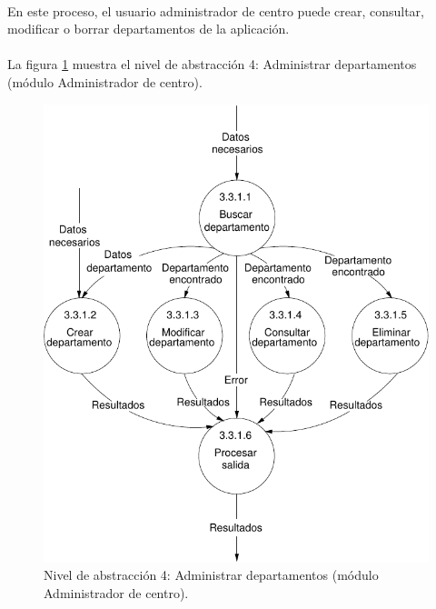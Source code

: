 \paragraph{}En este proceso, el usuario administrador de centro puede crear,
consultar, modificar o borrar departamentos de la aplicación.

\paragraph{}La figura \ref{diagramaNivel4-AdministrarDepartamentos-admCentro}
muestra el nivel de abstracción 4: Administrar departamentos (módulo
Administrador de centro).

  \begin{figure}[!ht]
    \begin{center}
      \includegraphics[]{08.Analisis_Funcional/8.2.DFDs/Niveles/Nivel4/AdministradorCentro/AdministrarDepartamentos/Diagramas/nivel4-AdministrarDepartamentos.pdf}
      \caption{Nivel de abstracción 4: Administrar departamentos (módulo Administrador de centro).}
      \label{diagramaNivel4-AdministrarDepartamentos-admCentro}
    \end{center}
  \end{figure}
